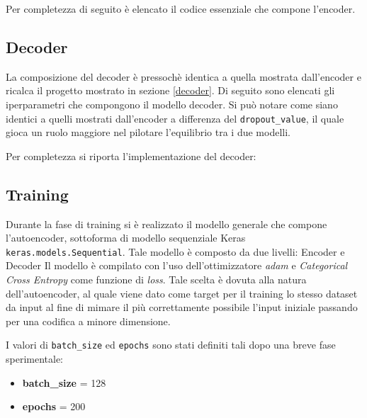 Per completezza di seguito è elencato il codice essenziale che compone l'encoder.



\subsection{Decoder}
\label{imp:autoe:dec}
La composizione del decoder è pressochè identica a quella mostrata dall'encoder e ricalca il progetto mostrato in sezione \ref{decoder}. Di seguito sono elencati gli iperparametri che compongono il modello decoder. Si può notare come siano identici a quelli mostrati dall'encoder a differenza del \lstinline!dropout_value!, il quale gioca un ruolo maggiore nel pilotare l'equilibrio tra i due modelli.



Per completezza si riporta l'implementazione del decoder:



\subsection{Training}
Durante la fase di training si è realizzato il modello generale che compone l'autoencoder, sottoforma di modello sequenziale Keras \lstinline!keras.models.Sequential!. Tale modello è composto da due livelli: Encoder e Decoder
Il modello è compilato con l'uso dell'ottimizzatore \textit{adam} e \textit{Categorical Cross Entropy} come funzione di \textit{loss}. Tale scelta è dovuta alla natura dell'autoencoder, al quale viene dato come target per il training lo stesso dataset da input al fine di mimare il più correttamente possibile l'input iniziale passando per una codifica a minore dimensione.



I valori di \lstinline!batch_size! ed \lstinline!epochs! sono stati definiti tali dopo una breve fase sperimentale:
\begin{itemize}
\item \textbf{batch\_size} = 128 
\item \textbf{epochs} = 200
\end{itemize}


